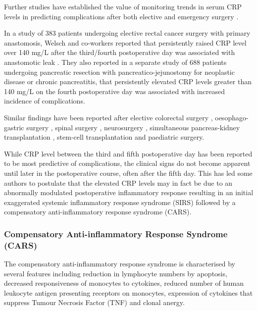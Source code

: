 Further studies have established the value of monitoring trends in serum CRP levels in predicting complications after both elective and emergency surgery \parencite{mustard_c-reactive_1987}. 

In a study of 383 patients undergoing elective rectal cancer surgery with primary anastomosis, Welsch and co-workers reported that persistently raised CRP level over 140 mg/L after the third/fourth postoperative day was associated with anastomotic leak \parencite{welsch_c-reactive_2007}. 
They also reported in a separate study of 688 patients undergoing pancreatic resection with pancreatico-jejunostomy for neoplastic disease or chronic pancreatitis, that persistently elevated CRP levels greater than 140 mg/L on the fourth postoperative day was associated with increased incidence of complications. 

Similar findings have been reported after elective colorectal surgery \parencite{ortega-deballon_c-reactive_2010, woeste_increased_2010}, oesophago-gastric surgery \parencite{dutta_persistent_2011}, spinal surgery \parencite{meyer_c-reactive_1995,mok_use_2008}, neurosurgery \parencite{al-jabi_value_2010}, simultaneous pancreas-kidney transplantation \parencite{wullstein_high_2004}, stem-cell transplantation \parencite{mcneer_early_2010} and paediatric surgery\parencite{laporta_baez_c-reactive_2011}.

While CRP level between the third and fifth postoperative day has been reported to be most predictive of complications, the clinical signs do not become apparent until later in the postoperative course, often after the fifth day. 
This has led some authors to postulate that the elevated CRP levels may in fact be due to an abnormally modulated postoperative inflammatory response resulting in an initial exaggerated systemic inflammatory response syndrome (SIRS) followed by a compensatory anti-inflammatory response syndrome (CARS). 

\subsubsection{Compensatory Anti-inflammatory Response Syndrome (CARS)}
The compensatory anti-inflammatory response syndrome is characterised by several features including reduction in lymphocyte numbers by apoptosis, decreased responsiveness of monocytes to cytokines, reduced number of human leukocyte antigen presenting receptors on monocytes, expression of cytokines that suppress Tumour Necrosis Factor (TNF) and clonal anergy.

